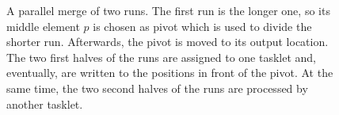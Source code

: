 \begin{figure}
	\caption{
		A parallel merge of two runs.
		The first run is the longer one, so its middle element \(p\) is chosen as pivot which is used to divide the shorter run.
		Afterwards, the pivot is moved to its output location.
		The two first halves of the runs are assigned to one tasklet and, eventually, are written to the positions in front of the pivot.
		At the same time, the two second halves of the runs are processed by another tasklet.
		\cite[Figure~27.6]{cormen2013algorithmen}
	}
	\label{fig:par:merge}
\end{figure}

















